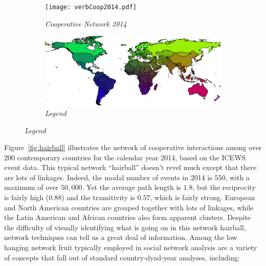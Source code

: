\documentclass[12pt,oneside,doublespace,pdflatex]{amsart}
\begin{document}
\begin{figure}[h!]\caption{\it Cooperative Verbal Interaction Network, 2014 ($\sim$ 800K events). \label{fig:hairball}}
   \centering 
    \begin{subfigure}[b]{.69\textwidth}
        \texttt{[image: verbCoop2014.pdf]}
        \caption{\it Cooperative Network 2014}
    \end{subfigure}
    \begin{subfigure}[b]{.3\textwidth}
        \includegraphics[width=\textwidth]{legend.pdf}
        \caption{\it Legend}
    \end{subfigure}
\end{figure}
Figure~\ref{fig:hairball} illustrates the network of cooperative interactions among over $200$ contemporary
countries for the calendar year 2014, based on the ICEWS event data.  This typical network ``hairball'' doesn't revel much
except that there are lots of linkages. Indeed, the modal number of events in 2014 is $550$, with a maximum of
over $50,000$.  Yet the average path length is $1.8$, but the reciprocity is fairly high ($0.88$) and
the transitivity is $0.57$, which is fairly strong. European and North American countries are grouped together with lots of
linkages, while the Latin American and African countries also form apparent clusters.  Despite the difficulty of visually
identifying what is going on in this network hairball, network techniques can tell us a great deal of information.  Among the low hanging network fruit typically employed in social network analysis are a variety of concepts that fall out of standard
country-dyad-year analyses, including:
\end{document}
